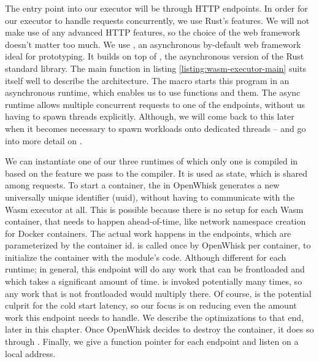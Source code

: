 The entry point into our executor will be through HTTP endpoints. In order for our executor to handle requests concurrently, we use Rust's  features. We will not make use of any advanced HTTP features, so the choice of the web framework doesn't matter too much. We use  \cite{Turon2021}, an asynchronous by-default web framework ideal for prototyping. It builds on top of , the asynchronous version of the Rust standard library. The main function in listing \ref{listing:wasm-executor-main} suits itself well to describe the architecture. The  macro starts this program in an asynchronous runtime, which enables us to use  functions and  them. The async runtime allows multiple concurrent requests to one of the endpoints, without us having to spawn threads explicitly. Although, we will come back to this later when it becomes necessary to spawn workloads onto dedicated threads -- and go into more detail on .

We can instantiate one of our three runtimes of which only one is compiled in based on the feature we pass to the compiler. It is used as state, which is shared among requests. To start a container, the  in OpenWhisk generates a new universally unique identifier (uuid), without having to communicate with the Wasm executor at all. This is possible because there is no setup for each Wasm container, that needs to happen ahead-of-time, like network namespace creation for Docker containers. The actual work happens in the endpoints, which are parameterized by the container id.  is called once by OpenWhisk per container, to initialize the container with the module's code. Although different for each runtime; in general, this endpoint will do any work that can be frontloaded and which takes a significant amount of time.  is invoked potentially many times, so any work that is not frontloaded would multiply there. Of course,  is the potential culprit for the cold start latency, so our focus is on reducing even the amount work this endpoint needs to handle. We describe the optimizations to that end, later in this chapter. Once OpenWhisk decides to destroy the container, it does so through .
Finally, we give  a function pointer for each endpoint and listen on a local address.

